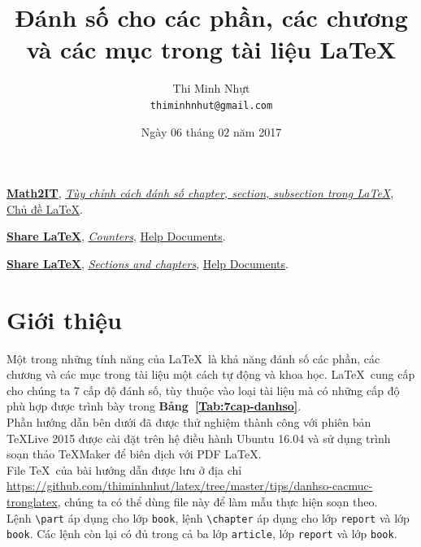 \documentclass[12pt,a4paper]{article}
\title{\bfseries \huge Đánh số cho các phần, các chương và các mục trong tài liệu \LaTeX}
\author{\Large Thi Minh Nhựt \bigskip \\  \Large \texttt{thiminhnhut@gmail.com}}
\date{\Large Ngày 06 tháng 02 năm 2017}
\newcommand{\tab}[1]{\textbf{Bảng~#1}}
\begin{document}
\maketitle
\tableofcontents

\begin{thebibliography}{99}
	 \href{http://math2it.com/}{\textbf{Math2IT}}, \href{https://goo.gl/HuiPpu}{\textit{Tùy chỉnh cách đánh số chapter, section, subsection trong \LaTeX}}, \href{http://math2it.com/category/latex/}{Chủ đề \LaTeX}.
	
	 \href{https://www.sharelatex.com}{\textbf{Share LaTeX}}, \href{https://goo.gl/weJlVt}{\emph{Counters}}, \href{https://www.sharelatex.com/learn}{Help Documents}.
	
	 \href{https://www.sharelatex.com}{\textbf{Share LaTeX}}, \href{https://goo.gl/e5ncGK}{\emph{Sections and chapters}}, \href{https://www.sharelatex.com/learn}{Help Documents}.   
\end{thebibliography}

\newpage
\section{Giới thiệu}
	Một trong những tính năng của \LaTeX\ là khả năng đánh số các phần, các chương và các mục trong tài liệu một cách tự động và khoa học. \LaTeX\ cung cấp cho chúng ta 7 cấp độ đánh số, tùy thuộc vào loại tài liệu mà có những cấp độ phù hợp được trình bày trong \tab{\ref{Tab:7cap-danhso}}.\\		
	
	Phần hướng dẫn bên dưới đã được thử nghiệm thành công với phiên bản \TeX Live 2015 được cài đặt trên hệ điều hành Ubuntu 16.04 và sử dụng trình soạn thảo \TeX Maker để biên dịch với PDF \LaTeX. \\
	
	File \TeX\ của bài hướng dẫn được lưu ở địa chỉ \url{https://github.com/thiminhnhut/latex/tree/master/tips/danhso-cacmuc-tronglatex}, chúng ta có thể dùng file này để làm mẫu thực hiện soạn theo.\\
	
	Lệnh \Verb|\part| áp dụng cho lớp \Verb|book|, lệnh \Verb|\chapter| áp dụng cho lớp \Verb|report| và lớp \Verb|book|. Các lệnh còn lại có đủ trong cả ba lớp \Verb|article|, lớp \Verb|report| và lớp \Verb|book|.
\end{document}
